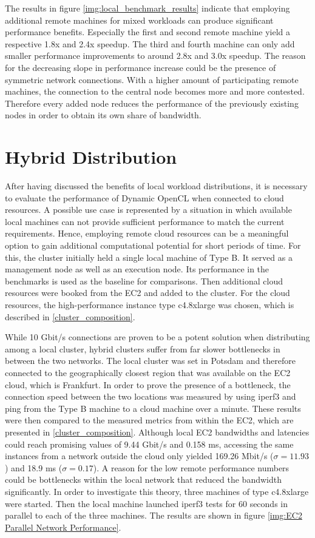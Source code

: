 The results in figure \ref{img:local_benchmark_results} indicate that employing additional remote machines for mixed workloads can produce significant performance benefits. Especially the first and second remote machine yield a respective 1.8x and 2.4x speedup. The third and fourth machine can only add smaller performance improvements to around 2.8x and 3.0x speedup. The reason for the decreasing slope in performance increase could be the presence of symmetric network connections. With a higher amount of participating remote machines, the connection to the central node becomes more and more contested. Therefore every added node reduces the performance of the previously existing nodes in order to obtain its own share of bandwidth.


\section{Hybrid Distribution}

After having discussed the benefits of local workload distributions, it is necessary to evaluate the performance of Dynamic OpenCL when connected to cloud resources. A possible use case is represented by a situation in which available local machines can not provide sufficient performance to match the current requirements. Hence, employing remote cloud resources can be a meaningful option to gain additional computational potential for short periods of time. For this, the cluster initially held a single local machine of Type B. It served as a management node as well as an execution node. Its performance in the benchmarks is used as the baseline for comparisons. Then additional cloud resources were booked from the EC2 and added to the cluster. For the cloud resources, the high-performance instance type c4.8xlarge was chosen, which is described in \ref{cluster_composition}.

While 10 Gbit/s connections are proven to be a potent solution when distributing among a local cluster, hybrid clusters suffer from far slower bottlenecks in between the two networks. The local cluster was set in Potsdam and therefore connected to the geographically closest region that was available on the EC2 cloud, which is Frankfurt. In order to prove the presence of a bottleneck, the connection speed between the two locations was measured by using iperf3 and ping from the Type B machine to a cloud machine over a minute. These results were then compared to the measured metrics from within the EC2, which are presented in \ref{cluster_composition}. Although local EC2 bandwidths and latencies could reach promising values of 9.44 Gbit/s and 0.158 ms, accessing the same instances from a network outside the cloud only yielded 169.26 Mbit/s ($\sigma = 11.93$) and 18.9 ms ($\sigma = 0.17$). A reason for the low remote performance numbers could be bottlenecks within the local network that reduced the bandwidth significantly. In order to investigate this theory, three machines of type c4.8xlarge were started. Then the local machine launched iperf3 tests for 60 seconds in parallel to each of the three machines. The results are shown in figure \ref{img:EC2 Parallel Network Performance}.

